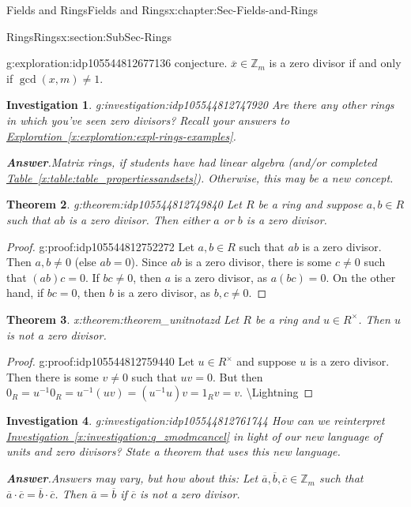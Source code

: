 \documentclass[oneside,10pt,]{book}
\newcommand{\blocktitlefont}{\relax}
\newcommand{\xreffont}{\relax}
\numberwithin{equation}{section}
\def\Z{{\mathbb Z}}
\newtheorem{theorem}{Theorem}[section]
\newtheorem{investigation}[theorem]{Investigation}
\begin{document}
\begin{chapterptx}{Fields and Rings}{}{Fields and Rings}{}{}{x:chapter:Sec-Fields-and-Rings}
\begin{sectionptx}{Rings}{}{Rings}{}{}{x:section:SubSec-Rings}
\begin{exploration}{}{g:exploration:idp105544812677136}
conjecture. \(\overline{x}\in \Z_m\) is a zero divisor if and only if \(\gcd(x,m) \ne 1\).%
\end{exploration}%
\begin{investigation}{}{g:investigation:idp105544812747920}%
Are there any other rings in which you've seen zero divisors? Recall your answers to \hyperref[x:exploration:expl-rings-examples]{Exploration~{\xreffont\ref{x:exploration:expl-rings-examples}}}.%
\par\smallskip%
\noindent\textbf{\blocktitlefont Answer}.\hypertarget{g:answer:idp105544812749072}{}\quad{}Matrix rings, if students have had linear algebra (and\slash{}or completed \hyperref[x:table:table_propertiessandsets]{Table~{\xreffont\ref{x:table:table_propertiessandsets}}}). Otherwise, this may be a new concept.%
\end{investigation}%
\begin{theorem}{}{}{g:theorem:idp105544812749840}%
Let \(R\) be a ring and suppose \(a,b\in R\) such that \(ab\) is a zero divisor. Then either \(a\) or \(b\) is a zero divisor.%
\end{theorem}
\begin{proof}{}{g:proof:idp105544812752272}
Let \(a,b\in R\) such that \(ab\) is a zero divisor. Then \(a,b\ne 0\) (else \(ab = 0\)). Since \(ab\) is a zero divisor, there is some \(c\ne 0\) such that \((ab) c = 0\). If \(bc\ne 0\), then \(a\) is a zero divisor, as \(a(bc) = 0\). On the other hand, if \(bc=0\), then \(b\) is a zero divisor, as \(b,c\ne 0\).%
\end{proof}
\begin{theorem}{}{}{x:theorem:theorem_unitnotazd}%
Let \(R\) be a ring and \(u\in R^\times\). Then \(u\) is not a zero divisor.%
\end{theorem}
\begin{proof}{}{g:proof:idp105544812759440}
Let \(u\in R^\times\) and suppose \(u\) is a zero divisor. Then there is some \(v\ne 0\) such that \(uv = 0\). But then \(0_R = u^{-1} 0_R = u^{-1} (uv) = (u^{-1} u) v = 1_R v = v\). \textbackslash{}Lightning%
\end{proof}
\begin{investigation}{}{g:investigation:idp105544812761744}%
How can we reinterpret \hyperref[x:investigation:q_zmodmcancel]{Investigation~{\xreffont\ref{x:investigation:q_zmodmcancel}}} in light of our new language of units and zero divisors? State a theorem that uses this new language.%
\par\smallskip%
\noindent\textbf{\blocktitlefont Answer}.\hypertarget{g:answer:idp105544812762896}{}\quad{}Answers may vary, but how about this: Let \(\overline{a},\overline{b},\overline{c}\in \Z_m\) such that \(\overline{a}\cdot \overline{c} = \overline{b}\cdot \overline{c}\). Then \(\overline{a} = \overline{b}\) if \(\overline{c}\) is not a zero divisor.%

\end{investigation}
\end{sectionptx}
\end{chapterptx}
\end{document}
